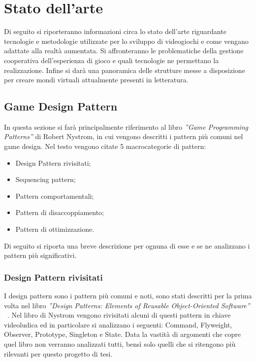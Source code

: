 \chapter{Stato dell'arte}\label{chap:Letteratura}
Di seguito si riporteranno informazioni circa lo stato dell'arte riguardante
tecnologie e metodologie utilizzate per lo sviluppo di videogiochi e come 
vengano adattate alla realtà aumentata. Si affronteranno le problematiche della 
gestione cooperativa dell'esperienza di gioco e quali tecnologie ne permettano 
la realizzazione. Infine si darà una panoramica delle strutture messe a 
disposizione per creare mondi virtuali attualmente presenti in letteratura.

\section{Game Design Pattern}\label{sec:GameDesignPattern}
In questa sezione si farà principalmente riferimento al libro \textit{''Game Programming Patterns''}
di Robert Nystrom\cite{Nystrom2014}, in cui vengono descritti i pattern più comuni nel
game design. Nel testo vengono citate 5 macrocategorie di pattern:
\begin{itemize}
    \item Design Pattern rivisitati;
    \item Sequencing pattern;
    \item Pattern comportamentali;
    \item Pattern di disaccoppiamento;
    \item Pattern di ottimizzazione.
\end{itemize}
Di seguito si riporta una breve descrizione per ognuna di esse e se ne analizzano
i pattern più significativi.

\subsection{Design Pattern rivisitati}\label{ssec:DesignPattern}
I design pattern sono i pattern più comuni e noti, sono stati descritti per la prima
volta nel libro \textit{''Design Patterns: Elements of Reusable Object-Oriented Software''}
~\cite{gangof4}. Nel libro di Nystrom vengono rivisitati alcuni di questi pattern
in chiave videoludica ed in particolare si analizzano i seguenti: Command, Flyweight,
Observer, Prototype, Singleton e State. Data la vastità di argomenti che copre quel libro
non verranno analizzati tutti, bensì solo quelli che si ritengono più rilevanti per
questo progetto di tesi.
